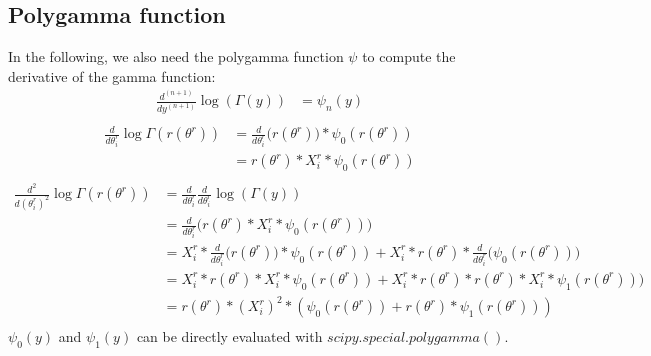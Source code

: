 \documentclass[bibliography=totoc,10pt]{scrartcl}
\begin{document}
\subsection{Polygamma function}
In the following, we also need the polygamma function $\psi$ to compute the derivative of the gamma function:
\begin{equation}
\begin{split}
\frac{d^{(n+1)}}{d y^{(n+1)}} \log(\Gamma(y)) &= \psi_n(y) \\
\end{split}
\end{equation}
\begin{equation}
\begin{split}
\frac{d}{d \theta^r_i} \log \Gamma(r(\theta^r)) &= \frac{d}{d \theta^r_i} \bigg( r(\theta^r) \bigg) * \psi_0(r(\theta^r)) \\
&= r(\theta^r) * X^r_{i} * \psi_0(r(\theta^r)) \\
\end{split}
\end{equation}
\begin{equation}
\begin{split}
\frac{d^2}{d (\theta^r_i)^2} \log \Gamma(r(\theta^r)) &= \frac{d}{d \theta^r_i} \frac{d}{d \theta^r_i} \log(\Gamma(y)) \\
&= \frac{d}{d \theta^r_i} \bigg( r(\theta^r) * X^r_{i} * \psi_0(r(\theta^r)) \bigg) \\
&= X^r_{i} * \frac{d}{d \theta^r_i} \bigg( r(\theta^r)  \bigg)* \psi_0(r(\theta^r)) + X^r_{i} * r(\theta^r)  *  \frac{d}{d \theta^r_i} \bigg(  \psi_0(r(\theta^r)) \bigg)   \\
&= X^r_{i} * r(\theta^r) * X^r_{i} * \psi_0(r(\theta^r)) + X^r_{i} * r(\theta^r)  * r(\theta^r) * X^r_{i} *  \psi_1(r(\theta^r)) \bigg)   \\
&= r(\theta^r) * (X^r_{i})^2 * ( \psi_0(r(\theta^r)) +  r(\theta^r) *  \psi_1(r(\theta^r)) )   \\
\end{split}
\end{equation}
$\psi_0(y)$ and $\psi_1(y)$ can be directly evaluated with $scipy.special.polygamma()$.
\end{document}
